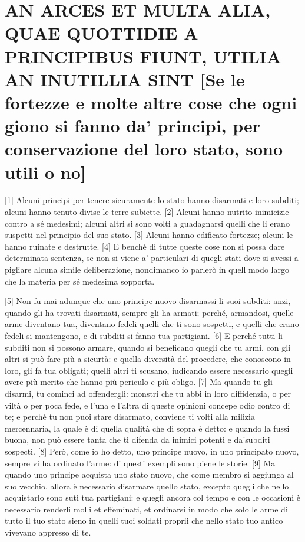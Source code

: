 \quebra\section{AN ARCES ET MULTA ALIA, QUAE QUOTTIDIE A PRINCIPIBUS FIUNT, UTILIA AN INUTILLIA SINT
{[}Se le fortezze e molte altre cose che ogni giono si fanno da'
principi, per conservazione del loro stato, sono utili o no{]}}

{[}1{]} Alcuni principi per tenere sicuramente lo stato hanno disarmati
e loro subditi; alcuni hanno tenuto divise le terre subiette. {[}2{]}
Alcuni hanno nutrito inimicizie contro a sé medesimi; alcuni altri si
sono volti a guadagnarsi quelli che li erano suspetti nel principio del
suo stato. {[}3{]} Alcuni hanno edificato fortezze; alcuni le hanno
ruinate e destrutte. {[}4{]} E benché di tutte queste cose non si possa
dare determinata sentenza, se non si viene a' particulari di quegli
stati dove si avessi a pigliare alcuna simile deliberazione, nondimanco
io parlerò in quell modo largo che la materia per sé medesima sopporta.

{[}5{]} Non fu mai adunque che uno principe nuovo disarmassi li suoi
subditi: anzi, quando gli ha trovati disarmati, sempre gli ha armati;
perché, armandosi, quelle arme diventano tua, diventano fedeli quelli
che ti sono sospetti, e quelli che erano fedeli si mantengono, e di
subditi si fanno tua partigiani. {[}6{]} E perché tutti li subditi non
si possono armare, quando si beneficano quegli che tu armi, con gli
altri si può fare più a sicurtà: e quella diversità del procedere, che
conoscono in loro, gli fa tua obligati; quelli altri ti scusano,
iudicando essere necessario quegli avere più merito che hanno più
periculo e più obligo. {[}7{]} Ma quando tu gli disarmi, tu cominci ad
offendergli: monstri che tu abbi in loro diffidenzia, o per viltà o per
poca fede, e l'una e l'altra di queste opinioni concepe odio contro di
te; e perché tu non puoi stare disarmato, conviene ti volti alla milizia
mercennaria, la quale è di quella qualità che di sopra è detto: e quando
la fussi buona, non può essere tanta che ti difenda da inimici potenti e
da'subditi sospecti. {[}8{]} Però, come io ho detto, uno principe nuovo,
in uno principato nuovo, sempre vi ha ordinato l'arme: di questi exempli
sono piene le storie. {[}9{]} Ma quando uno principe acquista uno stato
nuovo, che come membro si aggiunga al suo vecchio, allora è necessario
disarmare quello stato, excepto quegli che nello acquistarlo sono suti
tua partigiani: e quegli ancora col tempo e con le occasioni è
necessario renderli molli et effeminati, et ordinarsi in modo che solo
le arme di tutto il tuo stato sieno in quelli tuoi soldati proprii che
nello stato tuo antico vivevano appresso di te.

